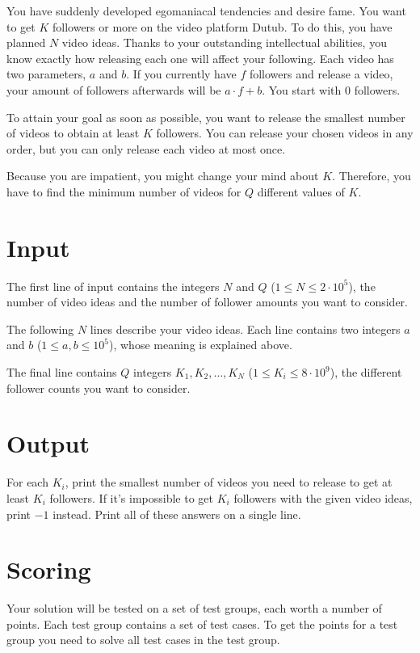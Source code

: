 
\noindent
You have suddenly developed egomaniacal tendencies and desire fame. You want to get $K$ followers or more on the video platform
Dutub. To do this, you have planned $N$ video ideas. Thanks to your outstanding intellectual abilities, you know exactly
how releasing each one will affect your following. Each video has two parameters, $a$ and $b$. If you currently have $f$ followers
and release a video, your amount of followers afterwards will be $a \cdot f + b$. You start with $0$ followers.

To attain your goal as soon as possible, you want to release the smallest number of videos to obtain at least $K$ followers.
You can release your chosen videos in any order, but you can only release each video at most once.

Because you are impatient, you might change your mind about $K$. Therefore, you have to find the minimum number of videos
for $Q$ different values of $K$.

\section*{Input}
The first line of input contains the integers $N$ and $Q$ ($1 \le N \le 2 \cdot 10^5$), the number of video ideas
and the number of follower amounts you want to consider.

The following $N$ lines describe your video ideas. Each line contains two integers $a$ and $b$ ($1 \leq a, b \leq 10^5$),
whose meaning is explained above.

The final line contains $Q$ integers $K_1, K_2, \dots, K_N$ ($1 \leq K_i \leq 8 \cdot 10^9$), the different follower counts
you want to consider.

\section*{Output}
For each $K_i$, print the smallest number of videos you need to release to get at least $K_i$ followers. If it's impossible
to get $K_i$ followers with the given video ideas, print $-1$ instead.
Print all of these answers on a single line.

\section*{Scoring}
Your solution will be tested on a set of test groups, each worth a number of points. Each test group contains
a set of test cases. To get the points for a test group you need to solve all test cases in the test group.

